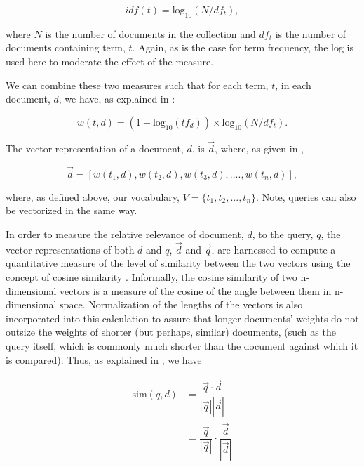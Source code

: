 \begin{equation}
idf(t)  = \textrm{log}_{10}(N/df_t),
\end{equation}

\noindent
where $N$ is the number of documents in the collection and $df_t$ is the number of documents containing term, $t$.  Again, as is the case for term frequency, the log is used here to moderate the effect of the measure.

We can combine these two measures such that for each term, $t$, in each document, $d$, we have, as explained in \cite{manning_2008_introduction_ch6}:

\begin{equation}
w(t,d) = (1 + \textrm{log}_{10}(tf_d)) \times \textrm{log}_{10}(N/df_t).
\end{equation}

\noindent
The vector representation of a document, $d$, is $\vec{d}$, where, as given in \cite{manning_2008_introduction_ch6},

\begin{equation}
\vec{d} =  [w(t_1,d), w(t_2,d), w(t_3,d),...., w(t_n, d)], 
\end{equation}

\noindent
where, as defined above, our vocabulary, $V=\{t_1,t_2, ..., t_n\}$.  Note, queries can also be vectorized in the same way.  

In order to measure the relative relevance of document, $d$, to the query, $q$, the vector representations of both $d$ and $q$, $\vec{d}$ and $\vec{q}$, are harnessed to compute a quantitative measure of the level of similarity between the two vectors using the concept of cosine similarity \cite{manning_2008_introduction_ch6}.  Informally, the cosine similarity of two n-dimensional vectors is a measure of the cosine of the angle between them in n-dimensional space.  Normalization of the lengths of the vectors is also incorporated into this calculation to assure that longer documents' weights do not outsize the weights of shorter (but perhaps, similar) documents, (such as the query itself, which is commonly much shorter than the document against which it is compared).  Thus, as explained in \cite{manning_2008_introduction_ch6}, we have

\begin{equation}
\begin{split}
\textrm{sim}(q, d) & = \dfrac{\vec{q} \cdot \vec{d}}{|\vec{q}||\vec{d}|} \\
 & = \dfrac{\vec{q}}{|\vec{q}|} \cdot \dfrac{\vec{d}}{|\vec{d}|}
\end{split}
\end{equation}

